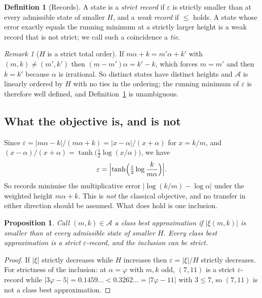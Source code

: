\documentclass[11pt]{article}
\newtheorem{proposition}[theorem]{Proposition}
\theoremstyle{definition}
\newtheorem{definition}[theorem]{Definition}
\theoremstyle{remark}
\newtheorem{remark}[theorem]{Remark}
\newcommand{\adm}{\mathcal{A}}
\begin{document}
\begin{definition}[Records]\label{def:records}
A state is a \emph{strict record} if $\varepsilon$ is strictly smaller than at every admissible
state of smaller $H$, and a \emph{weak record} if $\le$ holds. A state whose error exactly
equals the running minimum at a strictly larger height is a weak record that is not strict; we
call such a coincidence a \emph{tie}.
\end{definition}

\begin{remark}[$H$ is a strict total order]\label{rem:order}
If $m\alpha+k=m'\alpha+k'$ with $(m,k)\ne(m',k')$ then $(m-m')\alpha=k'-k$, which forces
$m=m'$ and then $k=k'$ because $\alpha$ is irrational. So distinct states have distinct heights
and $\adm$ is linearly ordered by $H$ with no ties in the ordering; the running minimum of
$\varepsilon$ is therefore well defined, and Definition~\ref{def:records} is unambiguous.
\end{remark}

\subsection{What the objective is, and is not}\label{sec:objective}

Since $\varepsilon=|m\alpha-k|/(m\alpha+k)=|x-\alpha|/(x+\alpha)$ for $x=k/m$, and
$(x-\alpha)/(x+\alpha)=\tanh\bigl(\tfrac12\log(x/\alpha)\bigr)$, we have
\begin{equation}\label{eq:tanh}
\varepsilon=\Bigl|\tanh\Bigl(\tfrac12\log\frac{k}{m\alpha}\Bigr)\Bigr| .
\end{equation}
So records minimise the multiplicative error $|\log(k/m)-\log\alpha|$ under the weighted height
$m\alpha+k$. This is \emph{not} the classical objective, and no transfer in either direction
should be assumed. What does hold is one inclusion.

\begin{proposition}\label{prop:classical}
Call $(m,k)\in\adm$ a \emph{class best approximation} if $|\xi(m,k)|$ is smaller than at every
admissible state of smaller $H$. Every class best approximation is a strict
$\varepsilon$-record, and the inclusion can be strict.
\end{proposition}

\begin{proof}
If $|\xi|$ strictly decreases while $H$ increases then $\varepsilon=|\xi|/H$ strictly
decreases. For strictness of the inclusion: at $\alpha=\varphi$ with $m,k$ odd, $(7,11)$ is a
strict $\varepsilon$-record while $|3\varphi-5|=0.1459\ldots<0.3262\ldots=|7\varphi-11|$ with
$3\le7$, so $(7,11)$ is not a class best approximation.
\end{proof}
\end{document}
